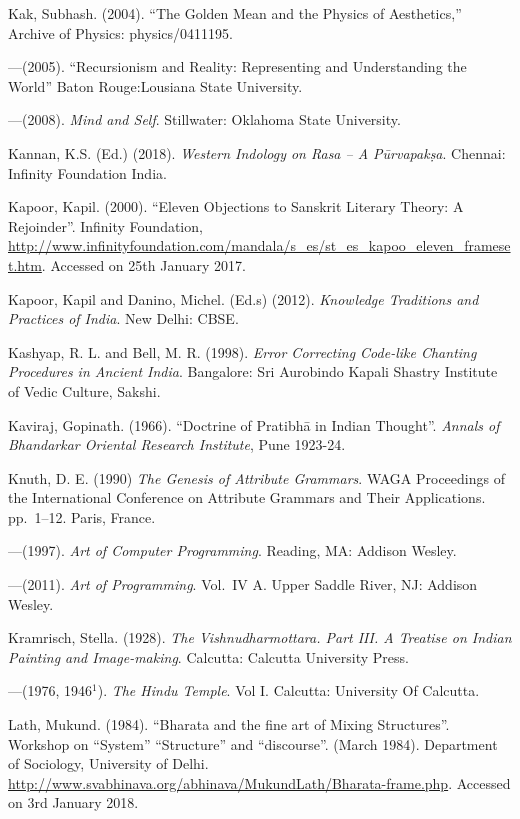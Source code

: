\begin{thebibliography}{99}
Kak, Subhash. (2004). “The Golden Mean and the Physics of Aesthetics,” Archive of Physics: physics/0411195.

---\kern3pt(2005). “Recursionism and Reality: Representing and Understanding the World” Baton Rouge:Lousiana State University.

---\kern3pt(2008). \textsl{Mind and Self}. Stillwater: Oklahoma State University.

Kannan, K.S. (Ed.) (2018). \textsl{Western Indology on Rasa -- A Pūrvapakṣa}. Chennai: Infinity Foundation India.

Kapoor, Kapil. (2000). “Eleven Objections to Sanskrit Literary Theory: A Rejoinder”. Infinity Foundation, \url{http://www.infinityfoundation.com/mandala/s_es/st_es_kapoo_eleven_frameset.htm}. Accessed on 25th January 2017.

Kapoor, Kapil and Danino, Michel. (Ed.s) (2012). \textsl{Knowledge Traditions and Practices of India}. New Delhi: CBSE.

Kashyap, R. L. and Bell, M. R. (1998). \textsl{Error Correcting Code-like Chanting Procedures in Ancient India}. Bangalore: Sri Aurobindo Kapali Shastry Institute of Vedic Culture, Sakshi.

Kaviraj, Gopinath. (1966). “Doctrine of Pratibhā in Indian Thought”. \textsl{Annals of Bhandarkar Oriental Research Institute}, Pune 1923-24.

Knuth, D. E. (1990) \textsl{The Genesis of Attribute Grammars}. WAGA Proceedings of the International Conference on Attribute Grammars and Their Applications. pp.~1--12. Paris, France.


---\kern3pt(1997). \textsl{Art of Computer Programming}. Reading, MA: Addison Wesley.

---\kern3pt(2011). \textsl{Art of Programming}. Vol.~IV A. Upper Saddle River, NJ: Addison Wesley.

Kramrisch, Stella. (1928). \textsl{The Vishnudharmottara. Part III. A Treatise on Indian Painting and Image-making}. Calcutta: Calcutta University Press.

---\kern3pt(1976, 1946$^{1}$). \textsl{The Hindu Temple}. Vol I. Calcutta: University Of Calcutta.

Lath, Mukund. (1984). “Bharata and the fine art of Mixing Structures”. Workshop on “System” “Structure” and “discourse”. (March 1984). Department of Sociology, University of Delhi. \url{http://www.svabhinava.org/abhinava/MukundLath/Bharata-frame.php}. Accessed on 3rd January 2018.


\end{thebibliography}
